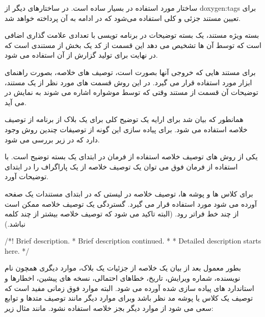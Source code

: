 ساختار مورد استفاده در  بسیار ساده است. در ساختارهای دیگر از
\glspl{doxygen:tag} برای تعیین مستند جزئی و کلی استفاده می‌شود که در ادامه به آن
پرداخته خواهد شد.

بسته ویژه مستند، یک بسته توضیحات در برنامه تویسی  با تعدادی علامت
گذاری اضافی است که  توسط آن ها تشخیص می دهد این قسمت از کد یک بخش از
مستندی است که در نهایت برای تولید گزارش از آن استفاده می شود.

برای مستند هایی که  خروجی آنها بصورت  است، توصیف های خلاصه، بصورت
راهنمای ابزار   مورد استفاده قرار می گیرد. در این روش قسمت های
مورد نظر از یک مستند، توضیحات آن قسمت از مستند وقتی که توسط موشواره اشاره می
شوند به نمایش در می آید.


همانطور که بیان شد برای ارایه یک توضیح کلی برای یک بلاک از برنامه از توصیف خلاصه
استفاده می شود. برای پیاده سازی این گونه از توصیفات چندین روش وجود دارد که در
زیر بررسی می شود.

یکی از روش های توصیف خلاصه استفاده از فرمان  در ابتدای
یک بسته توضیح است. با استفاده از فرمان فوق می توان یک توصیف خلاصه از یک پاراگراف
را در ابتدای توضیحات آورد.

برای کلاس ها و پوشه ها، توصیف خلاصه در لیستی که در ابتدای مستندات یک صفحه آورده
می شود مورد استفاده قرار می گیرد. گستردگی یک توصیف خلاصه ممکن است از چند خط
فراتر رود. (البته تاکید می شود که توصیف خلاصه بیشتر از چند کلمه نباشد.)


\begin{C++}
/*! \brief Brief description.
 *         Brief description continued.
 *
 *  Detailed description starts here.
 */
\end{C++}

بطور معمول بعد از بیان یک خلاصه از جزئیات یک بلاک، موارد دیگری همچون نام
نویسنده، شماره ویرایش، تاریخ، خطاهای احتمالی، نسخه های پیشین، اخطارها و
استاندارد های پیاده سازی شده آورده می شود. البته موارد فوق زمانی مفید است که
توصیف یک کلاس یا پوشه مد نظر باشد وبرای موارد دیگر مانند توصیف متدها و توابع سعی
می شود از موارد دیگر بجز خلاصه استفاده نشود. مانند مثال زیر:


